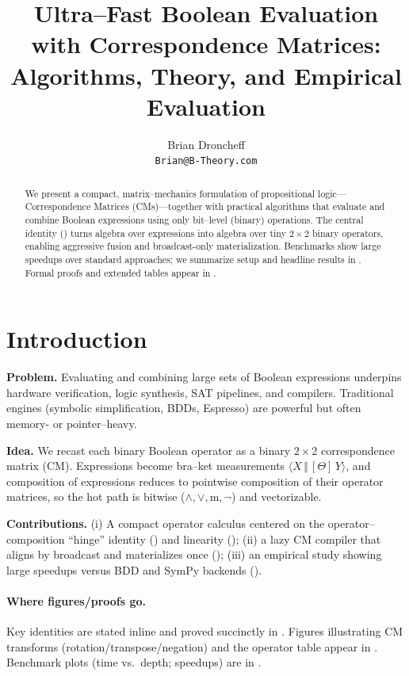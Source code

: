 \documentclass[11pt]{article}
\title{Ultra--Fast Boolean Evaluation with Correspondence Matrices:\\
Algorithms, Theory, and Empirical Evaluation}
\author{%
Brian Droncheff\\
\small \texttt{Brian@B-Theory.com}
}
\date{} %
\newcommand{\brrket}[2]{\langle #1 \,\Vert\, #2\rangle}  %
\newcommand{\CM}[1]{[{#1}]}
\newcommand{\xor}{\mathbin{\mathrm{m}}}
\begin{document}
\maketitle
\sloppy %

\begin{abstract}
We present a compact, matrix--mechanics formulation of propositional logic---Correspondence Matrices (CMs)---together with practical algorithms that evaluate and combine Boolean expressions using only bit--level (binary) operations. The central identity () turns algebra over expressions into algebra over tiny $2\times2$ binary operators, enabling aggressive fusion and broadcast-only materialization. Benchmarks show large speedups over standard approaches; we summarize setup and headline results in . Formal proofs and extended tables appear in .
\end{abstract}

\section{Introduction}
\label{sec:intro}
\textbf{Problem.} Evaluating and combining large sets of Boolean expressions underpins hardware verification, logic synthesis, SAT pipelines, and compilers. Traditional engines (symbolic simplification, BDDs, Espresso) are powerful but often memory- or pointer--heavy.

\textbf{Idea.} We recast each binary Boolean operator as a binary $2\times2$ correspondence matrix (CM). Expressions become bra--ket measurements $\brrket{X}{\CM{\Theta}\,Y}$, and composition of expressions reduces to pointwise composition of their operator matrices, so the hot path is bitwise (\(\land,\lor,\xor,\neg\)) and vectorizable.

\textbf{Contributions.}
(i) A compact operator calculus centered on the operator--composition ``hinge'' identity () and linearity ();
(ii) a lazy CM compiler that aligns by broadcast and materializes once ();
(iii) an empirical study showing large speedups versus BDD and SymPy backends ().

\paragraph{Where figures/proofs go.}
Key identities are stated inline and proved succinctly in . Figures illustrating CM transforms (rotation/transpose/negation) and the operator table appear in . Benchmark plots (time vs.\ depth; speedups) are in .
\end{document}
